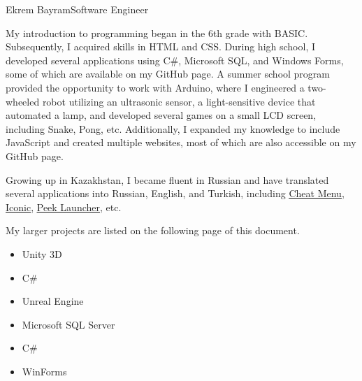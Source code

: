\documentclass{article}
\begin{document}
\begin{cv}[avatar]{Ekrem Bayram}{Software Engineer}



    My introduction to programming began in the 6th grade with BASIC. Subsequently, I acquired skills in HTML and CSS. During high school, I developed several applications using C\#, Microsoft SQL, and Windows Forms, some of which are available on my GitHub page. A summer school program provided the opportunity to work with Arduino, where I engineered a two-wheeled robot utilizing an ultrasonic sensor, a light-sensitive device that automated a lamp, and developed several games on a small LCD screen, including Snake, Pong, etc. Additionally, I expanded my knowledge to include JavaScript and created multiple websites, most of which are also accessible on my GitHub page.

    Growing up in Kazakhstan, I became fluent in Russian and have translated several applications into Russian, English, and Turkish, including \href{https://www.github.com/user-grinch/Cheat-Menu}{\uline{Cheat Menu}}, \href{https://www.play.google.com/store/apps/details?id=xeus.iconic}{\uline{Iconic}}, \href{https://www.polkuijken.medium.com/case-study-peek-launcher-220f0e505d51}{\uline{Peek Launcher}}, etc.

    My larger projects are listed on the following page of this document.


    \begin{cvevent}[2020][present]
        \begin{itemize}
            \item Unity 3D
            \item C\#
            \item Unreal Engine
        \end{itemize}
    \end{cvevent}

    \cvseparator[2]
    \begin{cvevent}[2019][2020]
        \begin{itemize}
            \item Microsoft SQL Server
            \item C\#
            \item WinForms
        \end{itemize}
    \end{cvevent}



\end{cv}
\end{document}
